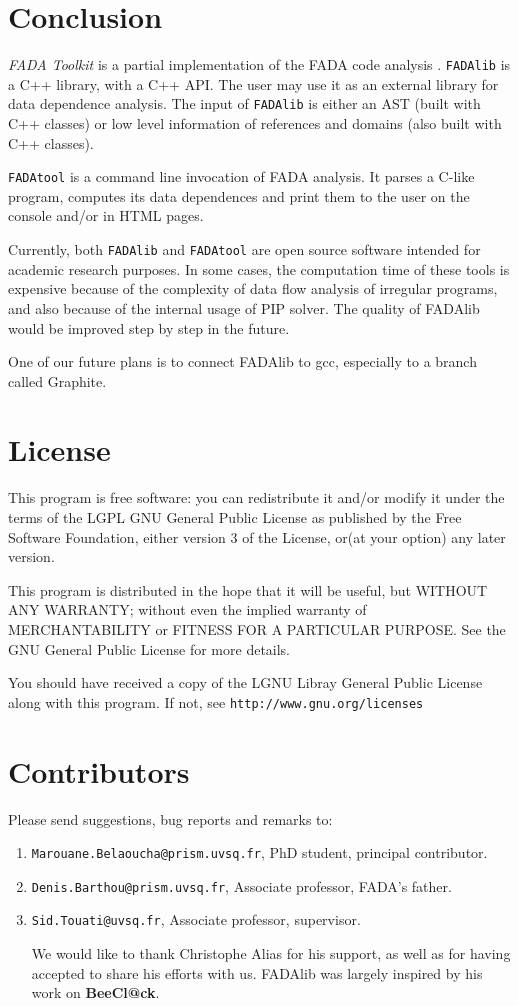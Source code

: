 

\section{Conclusion}
{\it FADA Toolkit} is a partial implementation of the FADA code analysis \cite{barthou_thesis}. \verb|FADAlib| is a C++ library, with a C++ API. The user may use it as an external library for data dependence analysis. The input of \verb|FADAlib| is either an AST (built with C++ classes) or low level information of references and domains (also built with C++ classes). 

\verb|FADAtool| is a command line invocation of FADA analysis. It parses a C-like program, computes its data dependences and print them to the user on the console and/or in HTML pages.

Currently, both  \verb|FADAlib| and  \verb|FADAtool| are open source software intended for academic research purposes. In some cases, the computation time of these tools is expensive because of the complexity of data flow analysis of irregular programs, and also because of the internal usage of PIP solver. The quality of FADAlib would be improved step by step in the future. 

One of our future plans is to connect FADAlib to gcc, especially to a branch called Graphite. 

\section*{License}
This program is free software: you can redistribute it and/or modify
it under the terms of the LGPL GNU General Public License as published by
the Free Software Foundation, either version 3 of the License, or(at your option) any later version.

This program is distributed in the hope that it will be useful,
but WITHOUT ANY WARRANTY; without even the implied warranty of
MERCHANTABILITY or FITNESS FOR A PARTICULAR PURPOSE.  See the
GNU General Public License for more details.

You should have received a copy of the LGNU Libray General Public License
along with this program.  If not, see \texttt{http://www.gnu.org/licenses}

\section*{Contributors}
Please send suggestions, bug reports and remarks to:
\begin{enumerate}
 \item \texttt{Marouane.Belaoucha@prism.uvsq.fr}, PhD student, principal contributor. 
 \item \texttt{Denis.Barthou@prism.uvsq.fr}, Associate professor, FADA's father. 
 \item \texttt{Sid.Touati@uvsq.fr}, Associate professor, supervisor.

We would like to thank Christophe Alias for his support, as well as for having accepted to share his efforts with us. FADAlib was largely inspired by his work on \textbf{BeeCl@ck}.
\end{enumerate}
